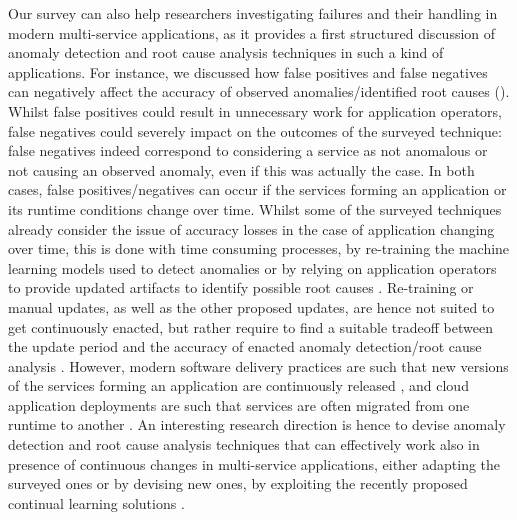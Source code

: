 Our survey can also help researchers investigating failures and their handling in modern multi-service applications, as it provides a first structured discussion of anomaly detection and root cause analysis techniques in such a kind of applications.
For instance, we discussed how false positives and false negatives can negatively affect the accuracy of observed anomalies/identified root causes ().
Whilst false positives could result in unnecessary work for application operators, false negatives could severely impact on the outcomes of the surveyed technique: false negatives indeed correspond to considering a service as not anomalous or not causing an observed anomaly, even if this was actually the case.
In both cases, false positives/negatives can occur if the services forming an application or its runtime conditions change over time.
Whilst some of the surveyed techniques already consider the issue of accuracy losses in the case of application changing over time, this is done with time consuming processes, \eg by re-training the machine learning models used to detect anomalies \cite{14_Samir2019_DLA,26_Wang2020_WorkflowAwareFaultDiagnosis,17_Gan2019_Seer} or by relying on application operators to provide updated artifacts to identify possible root causes \cite{11_Brandon2020_GraphBasedRootCauseAnalysis}.
Re-training or manual updates, as well as the other proposed updates, are hence not suited to get continuously enacted, but rather require to find a suitable tradeoff between the update period and the accuracy of enacted anomaly detection/root cause analysis \cite{14_Samir2019_DLA,17_Gan2019_Seer}.
However, modern software delivery practices are such that new versions of the services forming an application are continuously released \cite{Humble2010_ContinuousDelivery}, and cloud application deployments are such that services are often migrated from one runtime to another \cite{Carrasco2020_MigrationTransCloud}.  
An interesting research direction is hence to devise anomaly detection and root cause analysis techniques that can effectively work also in presence of continuous changes in multi-service applications, either adapting the surveyed ones or by devising new ones, \eg by exploiting the recently proposed continual learning solutions \cite{Lomonaco2021_ContinualAI}.

